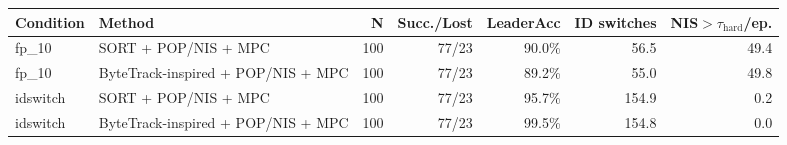 \begin{tabular}{llrrrrr}
\toprule
\textbf{Condition} & \textbf{Method} & \textbf{N} & \textbf{Succ./Lost} & \textbf{LeaderAcc} & \textbf{ID switches} & \textbf{NIS$>\tau_{\mathrm{hard}}$/ep.} \\
\midrule
fp\_10 & SORT + POP/NIS + MPC & 100 & 77/23 & 90.0\% & 56.5 & 49.4 \\
fp\_10 & ByteTrack-inspired + POP/NIS + MPC & 100 & 77/23 & 89.2\% & 55.0 & 49.8 \\
idswitch & SORT + POP/NIS + MPC & 100 & 77/23 & 95.7\% & 154.9 & 0.2 \\
idswitch & ByteTrack-inspired + POP/NIS + MPC & 100 & 77/23 & 99.5\% & 154.8 & 0.0 \\
\bottomrule
\end{tabular}
